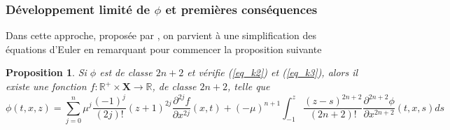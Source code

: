 \documentclass[12pt,a4paper]{article}
\newtheorem{prop}[dfn]{\textbf{Proposition}}
\numberwithin{equation}{section}
\begin{document}
\subsubsection{Développement limité de $\phi$ et premières conséquences}
Dans cette approche, proposée par \cite{MT}, on parvient à une simplification des équations d'Euler en remarquant pour commencer la proposition suivante
\begin{prop}
 
    Si $\phi$ est de classe $2n+2$ et vérifie (\ref{eq_k2}) et (\ref{eq_k3}), alors il existe une fonction $f:\mathbb{R}^+\times\textbf{X}\rightarrow \mathbb{R}$, de classe $2n+2$, telle que
    \begin{equation}
        \phi (t,x,z) = \sum_{j = 0}^{n} \mu^j\frac{(-1)^j}{(2j)!} (z+1)^{2j}\frac{\partial^{2j}f}{\partial x^{2j}}(x,t)
        + (-\mu)^{n+1}\int_{-1}^z\frac{(z-s)^{2n+2}}{(2n+2)!}\frac{\partial^{2n+2} \phi}{\partial x^{2n+2}}(t,x,s)ds
    \end{equation}
\end{prop}
\end{document}
